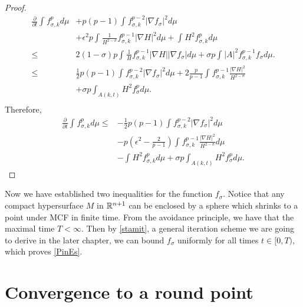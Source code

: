 \begin{proof}
\begin{equation*}
\begin{split}
            \frac{\partial }{\partial t}\int_{}^{}f_{\sigma,k }^{p} d \mu 
            &+ p(p-1)\int_{}^{}f_{\sigma,k }^{p-2} \left| \nabla f_\sigma  \right| ^2 d \mu \\
            &+ \epsilon ^2 p \int_{}^{}\frac{1}{H^{2-\sigma }}f_{\sigma,k }^{p-1} \left| \nabla H \right| ^2 d \mu + \int_{}^{}H^2 f_{\sigma,k }^{p} d \mu  \\ 
        \leq & 2(1-\sigma)p \int_{}^{} \frac{1}{H}f_{\sigma,k }^{p-1} \left| \nabla H \right| \left| \nabla f_{\sigma }^{}  \right| d \mu + \sigma p \int_{}^{} \left| A \right| ^2 f_{\sigma,k }^{p-1} f_{\sigma }^{} d \mu .  \\
        \leq & \frac{1}{2} p(p-1) \int_{}^{} f_{\sigma ,k}^{p-2} \left| \nabla f_{\sigma }^{}  \right| ^2 d \mu + 2 \frac{p}{p-1} \int_{}^{} f_{\sigma ,k}^{p-1} \frac{\left| \nabla H \right| ^2}{H^{2-\sigma }} \\
        &+ \sigma p \int_{A(k,t)}^{} H ^2  f_{\sigma }^{p} d \mu .  \\
        \end{split}
        \end{equation*}
    Therefore,
    \begin{equation*}
    \begin{split}
        \frac{\partial }{\partial t}\int_{}^{}f_{\sigma,k }^{p} d \mu 
    \leq&  -\frac{1}{2} p(p-1) \int_{}^{} f_{\sigma ,k}^{p-2} \left| \nabla f_{\sigma }^{}  \right| ^2 d \mu\\
    & -p\left( \epsilon ^2-\frac{2}{p-1} \right)\int_{}^{} f_{\sigma ,k}^{p-1} \frac{\left| \nabla H \right| ^2}{H^{2-\sigma }} d \mu  \\
    & - \int_{}^{}H^2 f_{\sigma,k }^{p} d \mu +\sigma p \int_{A(k,t)}^{} H ^2  f_{\sigma }^{p} d \mu .
    \end{split}
    \end{equation*} 
\end{proof}

Now we have established two inequalities for the function $f_{\sigma }^{} $. Notice that any compact hypersurface $M$ in $\mathbb{R}^{n+1}$ can be enclosed by a sphere which shrinks to a point under MCF in finite time. From the avoidance principle, we have that the maximal time $T< \infty $. Then by \autoref{stamit}, a general iteration scheme we are going to derive in the later chapter, we can bound $f_{\sigma }^{} $ uniformly for all times $t \in [0,T)$, which proves \autoref{PinEs}. 

\section{Convergence to a round point} \label{sec:crp}

